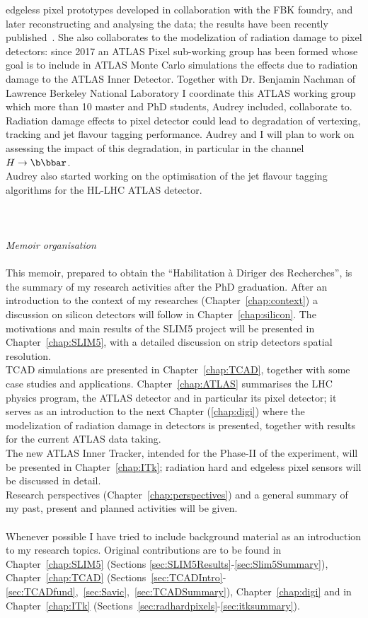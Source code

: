 edgeless pixel prototypes developed in collaboration with the FBK foundry, and later reconstructing 
and analysing the data; the results have been recently published~\cite{1748-0221-12-05-P05006}.
She also collaborates to the modelization of radiation damage to pixel detectors: since 2017 
an ATLAS Pixel sub-working group has been formed whose goal is to include in ATLAS Monte Carlo 
simulations the effects due to radiation damage to the ATLAS Inner Detector. Together 
with Dr. Benjamin Nachman of Lawrence Berkeley National Laboratory I coordinate this 
ATLAS working group  which more than 10 master and PhD students, Audrey included, collaborate to.
\\
Radiation damage effects to pixel detector could lead to degradation of vertexing, tracking 
and jet flavour tagging performance. Audrey and I will plan to work on assessing the impact of this 
degradation, in particular in the channel $H\to\b\bbar$. 
\\Audrey also started working on the optimisation of the jet flavour tagging algorithms for the
HL-LHC  ATLAS detector. 
\\
\\
\\
\\
{\it Memoir organisation}
\\
\\This memoir, prepared to obtain the ``Habilitation \`a Diriger des Recherches'', is the summary of my 
research activities after the PhD graduation. After an introduction to the context of my researches 
(Chapter~\ref{chap:context}) a discussion on silicon detectors will follow in Chapter~\ref{chap:silicon}.
The motivations and main results of the SLIM5 project will be presented in Chapter~\ref{chap:SLIM5}, 
with a detailed discussion on strip detectors spatial resolution.
\\TCAD simulations are presented in Chapter~\ref{chap:TCAD}, together with some case studies 
and applications.
Chapter~\ref{chap:ATLAS} summarises  the LHC physics program, the ATLAS detector and 
in particular its pixel detector; it serves as an introduction to the next Chapter (\ref{chap:digi}) where 
the modelization of radiation damage in detectors is presented, together with results for the 
current ATLAS data taking.
\\The new ATLAS Inner Tracker, intended for the Phase-II of the experiment, will be presented in 
Chapter~\ref{chap:ITk}; radiation hard and edgeless pixel sensors will be discussed in detail. 
\\ Research perspectives (Chapter~\ref{chap:perspectives}) and a general summary of my past, present 
and planned activities will be given.
\\
\\
Whenever possible I have tried to include background material as an introduction to my research topics. 
Original contributions are to be found in Chapter~\ref{chap:SLIM5} (Sections \ref{sec:SLIM5Results}-\ref{sec:Slim5Summary}), Chapter~\ref{chap:TCAD} (Sections~\ref{sec:TCADIntro}-\ref{sec:TCADfund},~\ref{sec:Savic},~\ref{sec:TCADSummary}), Chapter~\ref{chap:digi} and in 
Chapter~\ref{chap:ITk} (Sections~\ref{sec:radhardpixels}-\ref{sec:itksummary}).



